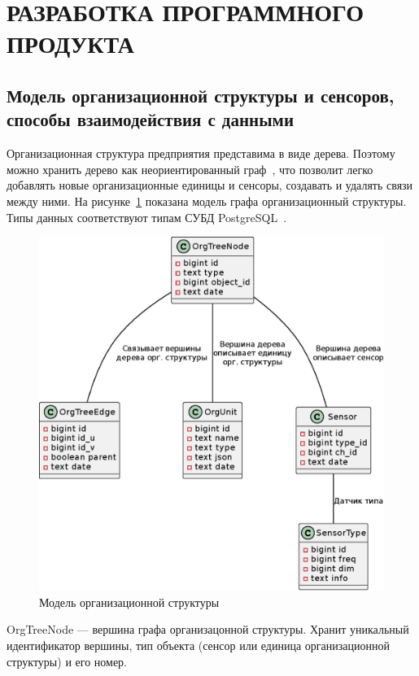 \section{РАЗРАБОТКА ПРОГРАММНОГО ПРОДУКТА}

\subsection{Модель организационной структуры и сенсоров, способы взаимодействия с данными}

Организационная структура предприятия представима в виде дерева. Поэтому можно хранить дерево как неориентированный граф~\cite{graphs}, что позволит легко добавлять новые организационные единицы и сенсоры, создавать и удалять связи между ними. На рисунке~\ref{datamodel} показана модель графа организационный структуры. Типы данных соответствуют типам СУБД PostgreSQL~\cite{pg-datatypes}.

\begin{figure}
  \includegraphics[scale=1.0]{img/datamodel.eps}
  \caption{Модель организационной структуры}
  \label{datamodel}
\end{figure}

OrgTreeNode --- вершина графа организацонной структуры. Хранит уникальный идентификатор вершины, тип объекта (сенсор или единица организационной структуры) и его номер.

